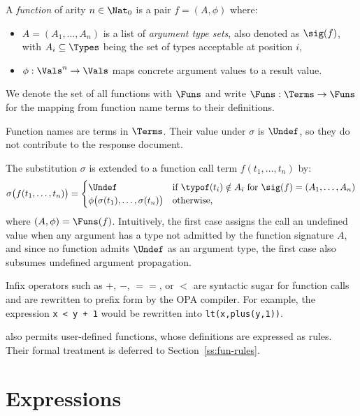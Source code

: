 
A \emph{function} of arity $n \in \Nat_0$ is a pair $f = (A, \phi)$ where:
\begin{itemize}
  \item $A = (A_1, \ldots, A_n)$ is a list of \emph{argument type sets}, also denoted as $\sig(f)$, with $A_i \subseteq \Types$ being the set of types acceptable at position $i$,
  \item $\phi : \Vals^n \to \Vals$ maps concrete argument values to a result value.
\end{itemize}
We denote the set of all functions with $\Funs$ and write $\Funs : \Terms \to \Funs$ for the mapping from function name terms to their definitions.

Function names are terms in $\Terms$.
Their value under $\sigma$ is $\Undef$, so they do not contribute to the response document.

The substitution $\sigma$ is extended to a function call term $f(t_1, \ldots, t_n)$ by:
\[
\sigma\bigl(f(t_1,\ldots,t_n)\bigr) =
\begin{cases}
  \Undef & \text{if } \typof(t_i) \notin A_i \text{ for } \sig(f) = (A_1,\ldots,A_n) \\
  \phi\bigl(\sigma(t_1),\ldots,\sigma(t_n)\bigr) & \text{otherwise,}
\end{cases}
\]
where $(A, \phi) = \Funs(f)$.
Intuitively, the first case assigns the call an undefined value when any argument has a type not admitted by the function signature $A$, and since no function admits $\Undef$ as an argument type, the first case also subsumes undefined argument propagation.

Infix operators such as $+$, $-$, $==$, or $<$ are syntactic sugar for function calls and are rewritten to prefix form by the OPA compiler.
For example, the expression \texttt{x < y + 1} would be rewritten into \texttt{lt(x,plus(y,1))}.

\rego also permits user-defined functions, whose definitions are expressed as rules.
Their formal treatment is deferred to Section~\ref{ss:fun-rules}.

\section{Expressions}
\label{s:exprs}

